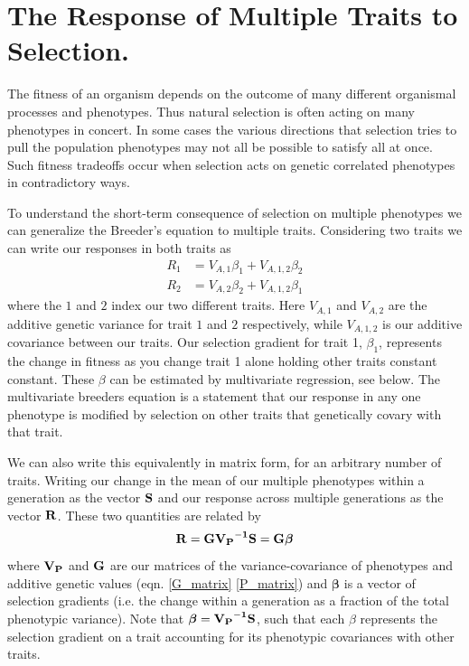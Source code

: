 
\chapter{The Response of Multiple Traits to Selection.}
The fitness of an organism depends on the outcome of many different
organismal processes and phenotypes. Thus natural selection is often acting on many
phenotypes in concert. In some cases the various directions that selection
tries to pull the population phenotypes may not all be possible to
satisfy all at once. Such fitness tradeoffs occur when selection acts on genetic correlated phenotypes in 
contradictory ways. 


To understand the short-term consequence of selection on multiple
phenotypes we can generalize the Breeder's equation  to multiple traits\cite{lande:79}. Considering two traits we can write our responses in both traits as
\begin{eqnarray}
R_1 & = V_{A,1} \beta_1 + V_{A,1,2} \beta_2 \nonumber \\
R_2 & = V_{A,2} \beta_2 + V_{A,1,2} \beta_1  \label{eqn:2D_breeders_eqn}
\end{eqnarray}
where the $1$ and $2$ index our two different traits. Here $V_{A,1} $
and $ V_{A,2}$ are the additive genetic variance for trait $1$ and $2$
respectively, while $V_{A,1,2}$ is our additive covariance between our
traits. Our selection gradient for trait 1, $\beta_1$, represents the
change in fitness as you change trait 1 alone holding other traits
constant constant. These $\beta$ can be estimated by multivariate
regression, see below. 
The multivariate breeders equation is a statement that our response in
any one phenotype is modified by selection on other traits that
genetically covary with that trait. 

We can also write this equivalently in matrix form, for an arbitrary
number of traits. Writing our change in the mean of our multiple phenotypes within a generation as the vector $\bf{S}$ and our response across multiple generations as
the vector $\bf{R}$. These two quantities are related by 
\begin{equation}
\bf{R} = \bf{G} \bf{V_P}^{-1} \bf{S} = \bf{G} \boldsymbol{ \beta} \label{eqn:MV_breeders_eqn}
\end{equation}
 where $\bf{V_P}$ and $\bf{G}$ are our matrices of the
 variance-covariance of phenotypes and additive genetic values
 (eqn. \eqref{G_matrix} \eqref{P_matrix}) and
 $\boldsymbol{\beta}$ is a vector of selection gradients (i.e. the
 change within a generation as a fraction of the total phenotypic
 variance). Note that $\boldsymbol{\beta} = \bf{V_P}^{-1} \bf{S} $, such
 that each $\beta$ represents the selection gradient on a trait
 accounting for its phenotypic covariances with other traits. 


